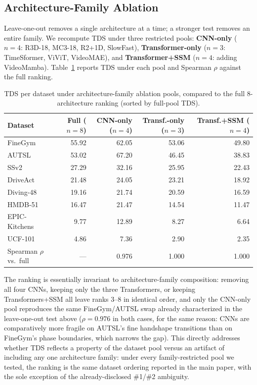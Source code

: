 \documentclass[runningheads]{llncs}
\newcommand{\tabtight}{\setlength{\tabcolsep}{3.5pt}\renewcommand{\arraystretch}{1.12}}
\newcommand{\TDS}{\textsc{TDS}}
\begin{document}
\subsection{Architecture-Family Ablation}
\label{sec:sup_family_ablation}

Leave-one-out removes a single architecture at a time; a stronger test removes an entire family. We recompute \TDS{} under three restricted pools: \textbf{CNN-only} ($n{=}4$: R3D-18, MC3-18, R2+1D, SlowFast), \textbf{Transformer-only} ($n{=}3$: TimeSformer, ViViT, VideoMAE), and \textbf{Transformer+SSM} ($n{=}4$: adding VideoMamba). Table~\ref{tab:family_ablation} reports \TDS{} under each pool and Spearman $\rho$ against the full ranking.

\begin{table}[!htbp]
\centering
\caption{\TDS{} per dataset under architecture-family ablation pools, compared to the full 8-architecture ranking (sorted by full-pool \TDS{}).}
\label{tab:family_ablation}
\scriptsize\tabtight
\begin{tabular}{l r r r r}
\toprule
Dataset & Full ($n{=}8$) & CNN-only ($n{=}4$) & Transf.-only ($n{=}3$) & Transf.+SSM ($n{=}4$) \\
\midrule
FineGym       & 55.92 & 62.05 & 53.06 & 49.80 \\
AUTSL         & 53.02 & 67.20 & 46.45 & 38.83 \\
SSv2          & 27.29 & 32.16 & 25.95 & 22.43 \\
DriveAct      & 21.48 & 24.05 & 23.21 & 18.92 \\
Diving-48     & 19.16 & 21.74 & 20.59 & 16.59 \\
HMDB-51       & 16.47 & 21.47 & 14.54 & 11.47 \\
EPIC-Kitchens &  9.77 & 12.89 &  8.27 &  6.64 \\
UCF-101       &  4.86 &  7.36 &  2.90 &  2.35 \\
\midrule
Spearman $\rho$ vs.\ full & --- & 0.976 & 1.000 & 1.000 \\
\bottomrule
\end{tabular}
\end{table}

The ranking is essentially invariant to architecture-family composition: removing all four CNNs, keeping only the three Transformers, or keeping Transformers+SSM all leave ranks 3--8 in identical order, and only the CNN-only pool reproduces the same FineGym/AUTSL swap already characterized in the leave-one-out test above ($\rho=0.976$ in both cases, for the same reason: CNNs are comparatively more fragile on AUTSL's fine handshape transitions than on FineGym's phase boundaries, which narrows the gap). This directly addresses whether \TDS{} reflects a property of the dataset pool versus an artifact of including any one architecture family: under every family-restricted pool we tested, the ranking is the same dataset ordering reported in the main paper, with the sole exception of the already-disclosed \#1/\#2 ambiguity.
\end{document}
